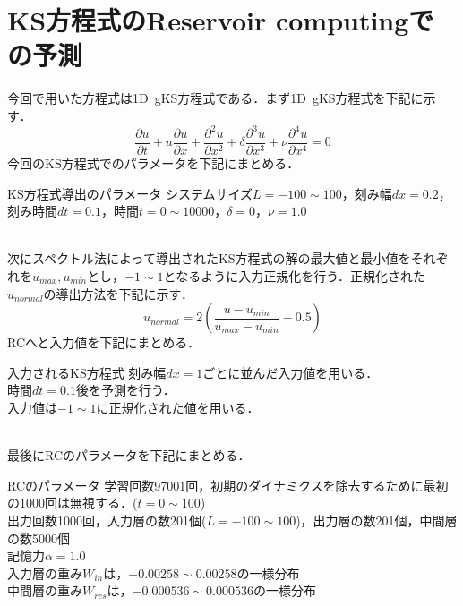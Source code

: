 \documentclass[autodetect-engine,dvipdfmx-if-dvi,ja=standard,a4paper,11pt]{bxjsarticle} %
\begin{document}

\newpage
\section{KS方程式のReservoir computingでの予測}
今回で用いた方程式は1D\ gKS方程式である．まず1D\ gKS方程式を下記に示す．
\begin{equation}
\frac{\partial u}{\partial t}+u\frac{\partial u}{\partial x}+\frac{\partial^2 u}{\partial x^2}+\delta\frac{\partial^3 u}{\partial x^3}+\nu\frac{\partial^4 u}{\partial x^4}=0
\label{eq:ks}
\end{equation}
今回のKS方程式でのパラメータを下記にまとめる．
\begin{itembox}[l]{KS方程式導出のパラメータ}
システムサイズ$L=-100\sim100$，刻み幅$dx=0.2$，刻み時間$dt=0.1$，時間$t=0\sim 10000$，$\delta=0$，$\nu=1.0$
\end{itembox}
\\
\　次にスペクトル法によって導出されたKS方程式の解の最大値と最小値をそれぞれを$u_{max},u_{min}$とし，$-1\sim1$となるように入力正規化を行う．正規化された$u_{normal}$の導出方法を下記に示す．
\begin{equation}
u_{normal}=2\left(\frac{u-u_{min}}{u_{max}-u_{min}}-0.5\right)
\end{equation}
RCへと入力値を下記にまとめる．
\begin{itembox}[l]{入力されるKS方程式}
刻み幅$dx=1$ごとに並んだ入力値を用いる．\\
時間$dt=0.1$後を予測を行う．\\
入力値は$-1\sim1$に正規化された値を用いる．
\end{itembox}
\\
\　最後にRCのパラメータを下記にまとめる．
\begin{itembox}[l]{RCのパラメータ}
学習回数97001回，初期のダイナミクスを除去するために最初の1000回は無視する．($t=0\sim100$)\\
出力回数1000回，入力層の数201個($L=-100\sim100$)，出力層の数201個，中間層の数5000個\\
記憶力$\alpha=1.0$\\
入力層の重み$W_{in}$は，$-0.00258\sim0.00258$の一様分布\\
中間層の重み$W_{res}$は，$-0.000536\sim0.000536$の一様分布
\end{itembox}
\end{document}
